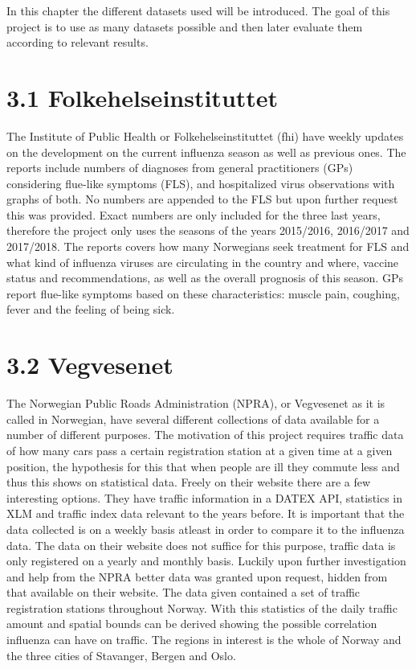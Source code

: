 In this chapter the different datasets used will be introduced. The goal of this project is to use as many datasets possible and then later evaluate them according to relevant results.

\section*{3.1 Folkehelseinstituttet}
The Institute of Public Health or Folkehelseinstituttet (fhi) have weekly updates\cite{fhi} on the development on the current influenza season as well as previous ones. The reports include numbers of diagnoses from general practitioners (GPs) considering flue-like symptoms (FLS), and hospitalized virus observations with graphs of both. No numbers are appended to the FLS but upon further request this was provided. Exact numbers are only included for the three last years, therefore the project only uses the seasons of the years 2015/2016, 2016/2017 and 2017/2018. The reports covers how many Norwegians seek treatment for FLS and what kind of influenza viruses are circulating in the country and where, vaccine status and recommendations, as well as the overall prognosis of this season. GPs report flue-like symptoms based on these characteristics: muscle pain, coughing, fever and the feeling of being sick.

\section*{3.2 Vegvesenet}
The Norwegian Public Roads Administration (NPRA), or Vegvesenet as it is called in Norwegian, have several different collections of data available for a number of different purposes. The motivation of this project requires traffic data of how many cars pass a certain registration station at a given time at a given position, the hypothesis for this that when people are ill they commute less and thus this shows on statistical data. Freely on their website \cite{vegvesenet} there are a few interesting options. They have traffic information in a DATEX API, statistics in XLM and traffic index data relevant to the years before. It is important that the data collected is on a weekly basis atleast in order to compare it to the influenza data. The data on their website does not suffice for this purpose, traffic data is only registered on a yearly and monthly basis. Luckily upon further investigation and help from the NPRA better data was granted upon request, hidden from that available on their website. The data given contained a set of traffic registration stations throughout Norway. With this statistics of the daily traffic amount and spatial bounds can be derived showing the possible correlation influenza can have on traffic. The regions in interest is the whole of Norway and the three cities of Stavanger, Bergen and Oslo.

